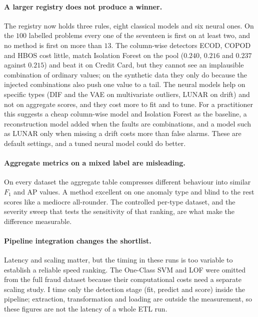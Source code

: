 \documentclass[conference]{IEEEtran}
\begin{document}
\paragraph{A larger registry does not produce a winner.} The registry now holds three
rules, eight classical models and six neural ones. On the $100$ labelled problems every one
of the seventeen is first on at least two, and no method is first on more than $13$. The
column-wise detectors ECOD, COPOD and HBOS cost little, match Isolation Forest on the pool
($0.240$, $0.216$ and $0.237$ against $0.215$) and beat it on Credit Card, but they cannot
see an implausible combination of ordinary values; on the synthetic data they only do
because the injected combinations also push one value to a tail. The neural models help on
specific types (DIF and the VAE on multivariate outliers, LUNAR on drift) and
not on aggregate scores, and they cost more to fit and to tune. For a practitioner this
suggests a cheap column-wise model and Isolation Forest as the baseline, a reconstruction model
added when the faults are combinations, and a model such as LUNAR only when missing a
drift costs more than false alarms. These are default settings, and a tuned neural model could do better.

\paragraph{Aggregate metrics on a mixed label are misleading.} On every
dataset the aggregate table compresses different behaviour into similar
$F_1$ and AP values. A method excellent on one anomaly type and blind
to the rest scores like a mediocre all-rounder. The controlled per-type
dataset, and the severity sweep that tests the sensitivity of that ranking,
are what make the difference measurable.

\paragraph{Pipeline integration changes the shortlist.} Latency and
scaling matter, but the timing in these runs is too variable to establish
a reliable speed ranking. The One-Class SVM and LOF were omitted from the
full fraud dataset because their computational costs need a separate
scaling study. I time only the detection stage (fit, predict and score)
inside the pipeline; extraction, transformation and loading are outside the
measurement, so these figures are not the latency of a whole ETL run.
\end{document}
